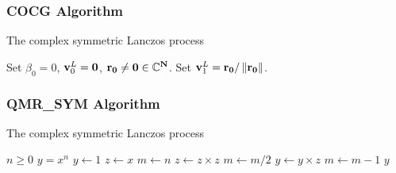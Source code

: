 \documentclass{article}
\begin{document}
\subsubsection{COCG Algorithm}
\begin{algorithm}
\caption{The complex symmetric Lanczos process}
\begin{algorithmic}[1]
\label{Alg1}
\State Set $\beta_0=0$, ${\bf{v}}^L_{0} = \bf{0}$, $\bf{r}_0 \neq \bf{0} \in \mathbb{C}^{N}$. 
\State Set ${\bf{v}}^{L}_{1} = \bf{r}_0 / \left\| \bf{r}_0 \right\|$.
\EndFor
\end{algorithmic}
\end{algorithm}

\subsubsection{QMR\_SYM Algorithm}

\begin{algorithm}
\caption{The complex symmetric Lanczos process}
\begin{algorithmic}[3]
\Require $n \geq 0$ 
\Ensure $y = x^n$ 
    \State $y \gets 1$
    \State $z \gets x$
    \State $m \gets n$
            \State $z \gets z \times z$
            \State $m \gets m / 2$
        \Else
            \State $y \gets y \times z$
            \State $m \gets m - 1$
        \EndIf
    \EndWhile
    \State \Return $y$
\EndFunction
\end{algorithmic}
\end{algorithm}
\end{document}
